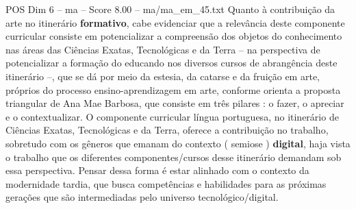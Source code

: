 \begin{textsample}{POS Dim 6 – ma – Score 8.00 – ma/ma\_em\_45.txt}
Quanto à contribuição da arte no itinerário \textbf{formativo}, cabe evidenciar que a relevância deste componente curricular consiste em potencializar a compreensão dos objetos do conhecimento nas áreas das Ciências Exatas, Tecnológicas e da Terra – na perspectiva de potencializar a formação do educando nos diversos cursos de abrangência deste itinerário –, que se dá por meio da estesia, da catarse e da fruição em arte, próprios do processo ensino-aprendizagem em arte, conforme orienta a proposta triangular de Ana Mae Barbosa, que consiste em três pilares : o fazer, o apreciar e o contextualizar.
O componente curricular língua portuguesa, no itinerário de Ciências Exatas, Tecnológicas e da Terra, oferece a contribuição no trabalho, sobretudo com os gêneros que emanam do contexto ( semiose ) \textbf{digital}, haja vista o trabalho que os diferentes componentes/cursos desse itinerário demandam sob essa perspectiva.
Pensar dessa forma é estar alinhado com o contexto da modernidade tardia, que busca competências e habilidades para as próximas gerações que são intermediadas pelo universo tecnológico/digital.

\end{textsample}

